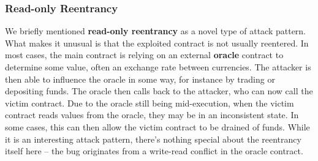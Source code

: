 \subsubsection{Read-only Reentrancy}
We briefly mentioned \textbf{read-only reentrancy} as a novel type of attack pattern. What makes it unusual is that the exploited contract is not usually reentered. In most cases, the main contract is relying on an external \textbf{oracle} contract to determine some value, often an exchange rate between currencies. The attacker is then able to influence the oracle in some way, for instance by trading or depositing funds. The oracle then calls back to the attacker, who can now call the victim contract. Due to the oracle still being mid-execution, when the victim contract reads values from the oracle, they may be in an inconsistent state. In some cases, this can then allow the victim contract to be drained of funds. While it is an interesting attack pattern, there's nothing special about the reentrancy itself here -- the bug originates from a write-read conflict in the oracle contract.

